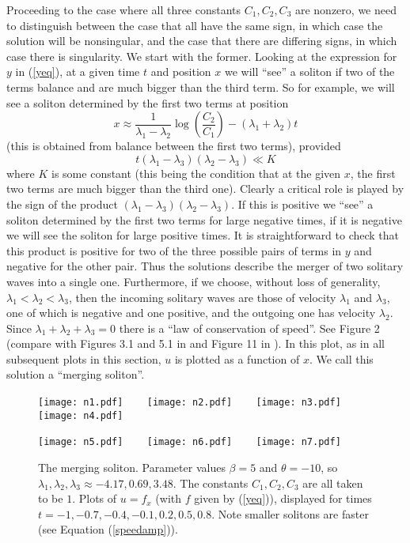 \documentclass[12pt]{article}
\begin{document}
Proceeding to the case where all three constants $C_1,C_2,C_3$ are nonzero, we need to distinguish between the
case that all have the same sign, in which case the solution will be nonsingular, and the case that there are
differing signs, in which case there is singularity. We start with the former. Looking at the expression for $y$ in 
(\ref{yeq}), at a given time $t$ and position $x$ we will ``see'' a soliton if two of the terms balance and
are much bigger than the third term.  So for example, we will see a soliton determined by the first two terms
at position 
$$
x \approx  \frac{1}{\lambda_1-\lambda_2} \log\left( \frac{C_2}{C_1} \right)  - (\lambda_1+\lambda_2) t   
$$
(this is obtained from balance between the first two terms), provided
$$
t(\lambda_1 - \lambda_3)(\lambda_2 - \lambda_3) \ll  K
$$
where $K$ is some constant (this being the condition that at the given $x$, the first two terms are much
bigger than the third one).  Clearly a critical role is played by the sign of the product
$(\lambda_1 - \lambda_3)(\lambda_2 - \lambda_3)$. If this is positive we ``see'' a soliton determined
by the first two terms for large negative times, if it is negative we will see the soliton for large positive times.
It is straightforward to check that this product is  positive for two of the three possible pairs of
terms in $y$ and negative for the other pair. Thus the solutions describe the merger of two
solitary waves  into a single one. Furthermore, if we choose, without loss of generality,
$\lambda_1<\lambda_2<\lambda_3$, then the incoming solitary waves are those of velocity $\lambda_1$ and $\lambda_3$,
one of which is negative and one positive, and the outgoing one has velocity $\lambda_2$.
Since $\lambda_1+\lambda_2+\lambda_3=0$ there is a ``law of conservation of speed''. See Figure 2 (compare
with Figures 3.1 and 5.1 in \cite{beq59} and 
Figure 11 in \cite{beq11}). In this plot, as in all subsequent plots in this section, $u$ is plotted as a function of $x$. 
We call this solution a ``merging soliton''. 

\begin{figure}
      \centerline{
        \texttt{[image: n1.pdf]} ~~~
        \texttt{[image: n2.pdf]} ~~~
        \texttt{[image: n3.pdf]} ~~~
        \texttt{[image: n4.pdf]} 
        }
      \centerline{
        \texttt{[image: n5.pdf]} ~~~
        \texttt{[image: n6.pdf]} ~~~
        \texttt{[image: n7.pdf]} 
        }
      \caption{The merging soliton.  Parameter values $\beta=5$ and $\theta=-10$, so $\lambda_1,\lambda_2,\lambda_3 \approx -4.17,0.69,3.48$.
        The constants $C_1,C_2,C_3$ are all taken to be $1$.
        Plots of $u=f_x$ (with $f$ given by (\ref{yeq})),  displayed for times
      $t=-1,-0.7,-0.4,-0.1,0.2,0.5,0.8$. Note  smaller solitons are faster (see Equation (\ref{speedamp})).} 
\end{figure}
\end{document}

